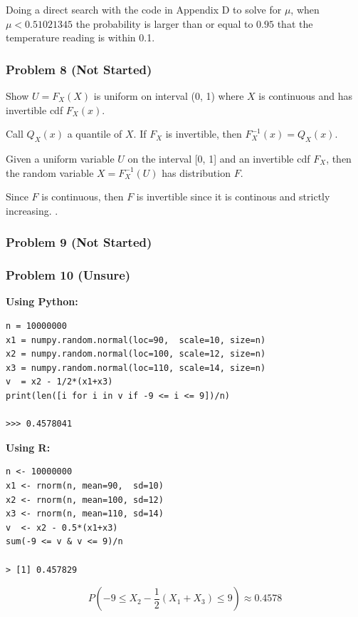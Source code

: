 \documentclass[11pt]{extarticle}
\begin{document}
Doing a direct search with the code in Appendix D to solve for $\mu$, when $\boxed{\mu < 0.51021345}$ the probability is larger than or equal to $0.95$ that the temperature reading is within 0.1.

\subsubsection*{Problem 8 (Not Started)}

Show $U = F_X(X)$ is uniform on interval (0, 1) where $X$ is continuous and has invertible cdf $F_X(x)$.

Call $Q_X(x)$ a quantile of $X$. If $F_X$ is invertible, then $F_X^{-1}(x) = Q_X(x)$.

Given a uniform variable $U$ on the interval [0, 1] and an invertible cdf $F_X$, then the random variable $X=F_X^{-1}(U)$ has distribution $F$.

Since $F$ is continuous, then $F$ is invertible since it is continous and strictly increasing. .

\subsubsection*{Problem 9 (Not Started)}



\subsubsection*{Problem 10 (Unsure)}


\textbf{Using Python:
}\begin{verbatim}n = 10000000
x1 = numpy.random.normal(loc=90,  scale=10, size=n)
x2 = numpy.random.normal(loc=100, scale=12, size=n)
x3 = numpy.random.normal(loc=110, scale=14, size=n)
v  = x2 - 1/2*(x1+x3)
print(len([i for i in v if -9 <= i <= 9])/n)

>>> 0.4578041
\end{verbatim}

\textbf{Using R:
}\begin{verbatim}n <- 10000000
x1 <- rnorm(n, mean=90,  sd=10)
x2 <- rnorm(n, mean=100, sd=12)
x3 <- rnorm(n, mean=110, sd=14)
v  <- x2 - 0.5*(x1+x3)
sum(-9 <= v & v <= 9)/n

> [1] 0.457829
\end{verbatim}

$$ P \left( -9 \leq X_2 - \frac{1}{2} (X_1 + X_3 ) \leq 9 \right) \approx  \boxed{0.4578}$$ %
\end{document}
